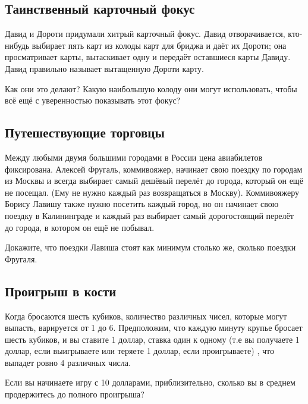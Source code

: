           


\subsection*{Таинственный карточный фокус}%


Давид и Дороти придумали хитрый карточный фокус. Давид отворачивается, кто-нибудь выбирает пять карт из колоды карт для бриджа и даёт их Дороти; она просматривает карты, вытаскивает одну и передаёт оставшиеся карты Давиду.  Давид правильно называет вытащенную Дороти карту.


Как они это делают? Какую наибольшую колоду они могут использовать, чтобы всё ещё с уверенностью %
показывать этот фокус? %

\subsection*{Путешествующие торговцы}%

Между любыми двумя большими городами в России цена авиабилетов фиксирована.
Алексей Фругаль, коммивояжер, начинает свою поездку по городам из Москвы и всегда выбирает самый дешёвый перелёт до города, который он ещё не посещал. (Ему не нужно каждый раз возвращаться в Москву). Коммивояжеру Борису Лавишу также нужно посетить каждый  город, но он начинает свою поездку в Калининграде  и  каждый раз выбирает самый дорогостоящий перелёт до города, в котором он ещё не побывал.

Докажите, что поездки Лавиша стоят как минимум столько же, сколько поездки Фругаля.

\subsection*{Проигрыш в кости}%


Когда бросаются шесть кубиков, количество различных чисел, которые могут выпасть, варируется от 1 до 6.  Предположим, что каждую минуту крупье бросает шесть кубиков,
и вы ставите 1 доллар,  ставка один к одному (т.е вы получаете 1 доллар, если выигрываете или теряете 1 доллар, если проигрываете) %
, что выпадет ровно 4 различных числа. %


Если вы начинаете игру с 10 долларами,  приблизительно, сколько вы в среднем продержитесь до полного проигрыша?

